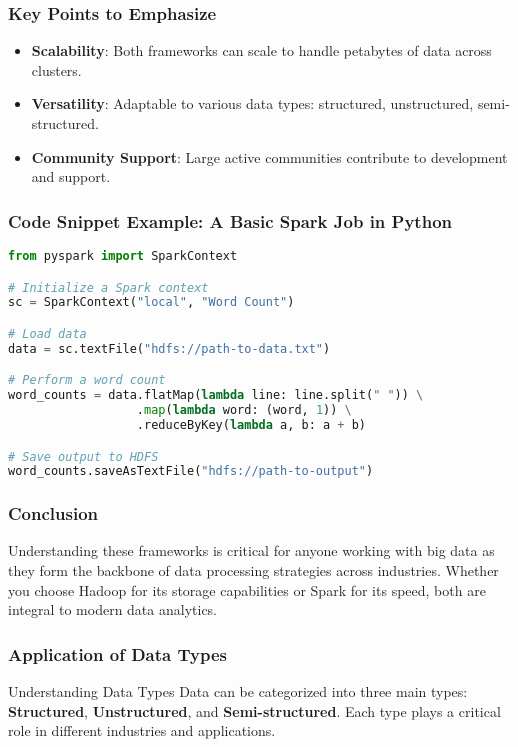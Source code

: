 \documentclass{beamer}
\begin{document}
\begin{frame}
    \frametitle{Key Points to Emphasize}
    \begin{itemize}
        \item \textbf{Scalability}: Both frameworks can scale to handle petabytes of data across clusters.
        \item \textbf{Versatility}: Adaptable to various data types: structured, unstructured, semi-structured.
        \item \textbf{Community Support}: Large active communities contribute to development and support.
    \end{itemize}
\end{frame}

\begin{frame}[fragile]
    \frametitle{Code Snippet Example: A Basic Spark Job in Python}
    \begin{lstlisting}[language=Python]
from pyspark import SparkContext

# Initialize a Spark context
sc = SparkContext("local", "Word Count")

# Load data
data = sc.textFile("hdfs://path-to-data.txt")

# Perform a word count
word_counts = data.flatMap(lambda line: line.split(" ")) \
                  .map(lambda word: (word, 1)) \
                  .reduceByKey(lambda a, b: a + b)

# Save output to HDFS
word_counts.saveAsTextFile("hdfs://path-to-output")
    \end{lstlisting}
\end{frame}

\begin{frame}
    \frametitle{Conclusion}
    Understanding these frameworks is critical for anyone working with big data as they form the backbone of data processing strategies across industries. Whether you choose Hadoop for its storage capabilities or Spark for its speed, both are integral to modern data analytics.
\end{frame}

\begin{frame}[fragile]
    \frametitle{Application of Data Types}
    \begin{block}{Understanding Data Types}
        Data can be categorized into three main types: \textbf{Structured}, \textbf{Unstructured}, and \textbf{Semi-structured}. Each type plays a critical role in different industries and applications.
    \end{block}
\end{frame}
\end{document}
